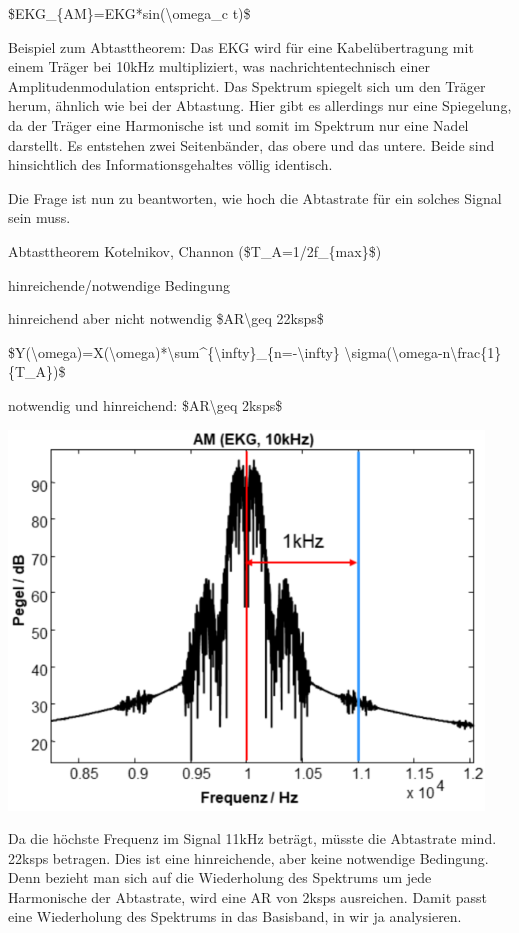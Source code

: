 \documentclass[a4paper]{article}
\begin{document}
\begin{multicols}{3}
  \begin{itemize*}
    \item \$EKG\_\{AM\}=EKG*sin(\textbackslash omega\_c t)\$
    \item Beispiel zum Abtasttheorem: Das EKG wird für eine Kabelübertragung mit einem Träger bei 10kHz multipliziert, was nachrichtentechnisch einer Amplitudenmodulation entspricht. Das Spektrum spiegelt sich um den Träger herum, ähnlich wie bei der Abtastung. Hier gibt es allerdings nur eine Spiegelung, da der Träger eine Harmonische ist und somit im Spektrum nur eine Nadel darstellt. Es entstehen zwei Seitenbänder, das obere und das untere. Beide sind hinsichtlich des Informationsgehaltes völlig identisch.
    \item Die Frage ist nun zu beantworten, wie hoch die Abtastrate für ein solches Signal sein muss.
  \end{itemize*}

  Abtasttheorem Kotelnikov, Channon (\$T\_A=1/2f\_\{max\}\$)

  \begin{itemize*}
    \item hinreichende/notwendige Bedingung
    \item hinreichend aber nicht notwendig \$AR\textbackslash geq 22ksps\$
    \item \$Y(\textbackslash omega)=X(\textbackslash omega)*\textbackslash sum\^{}\{\textbackslash infty\}\_\{n=-\textbackslash infty\} \textbackslash sigma(\textbackslash omega-n\textbackslash frac\{1\}\{T\_A\})\$
    \item notwendig und hinreichend: \$AR\textbackslash geq 2ksps\$
    \item \includegraphics[width=.5\linewidth]{Assets/Biosignalverarbeitung-abtastung-kotelnikov.png}
    \item Da die höchste Frequenz im Signal 11kHz beträgt, müsste die Abtastrate mind. 22ksps betragen. Dies ist eine hinreichende, aber keine notwendige Bedingung. Denn bezieht man sich auf die Wiederholung des Spektrums um jede Harmonische der Abtastrate, wird eine AR von 2ksps ausreichen. Damit passt eine Wiederholung des Spektrums in das Basisband, in wir ja analysieren.
  \end{itemize*}


\end{multicols}
\end{document}
